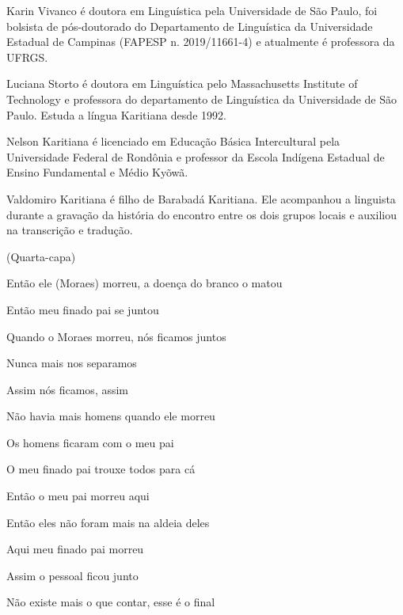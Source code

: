 Karin Vivanco é doutora em Linguística pela Universidade de São Paulo,
foi bolsista de pós-doutorado do Departamento de Linguística da
Universidade Estadual de Campinas (FAPESP n. 2019/11661-4) e atualmente
é professora da UFRGS.

Luciana Storto é doutora em Linguística pelo Massachusetts Institute of
Technology e professora do departamento de Linguística da Universidade
de São Paulo. Estuda a língua Karitiana desde 1992.

Nelson Karitiana é licenciado em Educação Básica Intercultural pela
Universidade Federal de Rondônia e professor da Escola Indígena Estadual
de Ensino Fundamental e Médio Kyõwã.

Valdomiro Karitiana é filho de Barabadá Karitiana. Ele acompanhou a
linguista durante a gravação da história do encontro entre os dois
grupos locais e auxiliou na transcrição e tradução.

(Quarta-capa)

Então ele (Moraes) morreu, a doença do branco o matou

Então meu finado pai se juntou

Quando o Moraes morreu, nós ficamos juntos

Nunca mais nos separamos

Assim nós ficamos, assim

Não havia mais homens quando ele morreu

Os homens ficaram com o meu pai

O meu finado pai trouxe todos para cá

Então o meu pai morreu aqui

Então eles não foram mais na aldeia deles

Aqui meu finado pai morreu

Assim o pessoal ficou junto

Não existe mais o que contar, esse é o final

